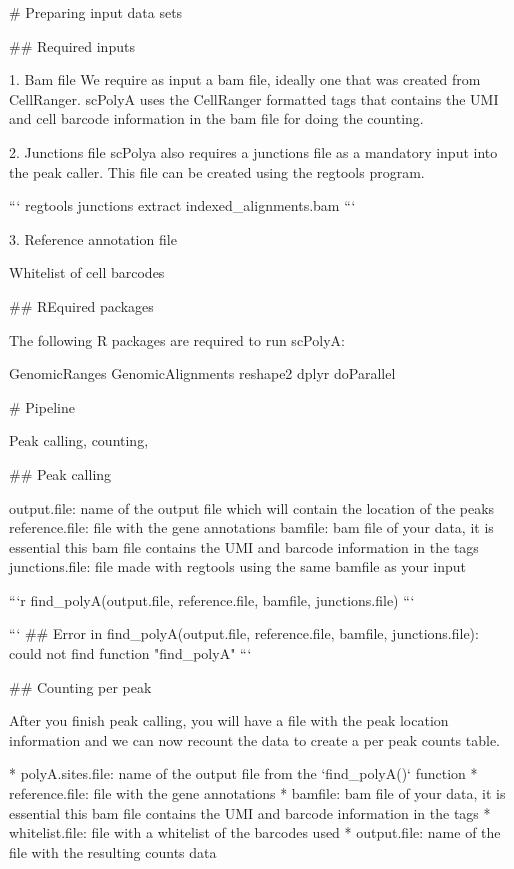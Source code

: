 # Preparing input data sets

## Required inputs



1. Bam file We require as input a bam file, ideally one that was created from CellRanger. scPolyA uses the CellRanger formatted tags that contains the UMI and cell barcode information in the bam file for doing the counting.

2. Junctions file scPolya also requires a junctions file as a mandatory input into the peak caller. This file can be created using the regtools program.

```
regtools junctions extract indexed_alignments.bam
```


3. Reference annotation file

    Whitelist of cell barcodes




## REquired packages

The following R packages are required to run scPolyA:

    GenomicRanges
    GenomicAlignments
    reshape2
    dplyr
    doParallel



# Pipeline

Peak calling, counting, 

## Peak calling


    output.file: name of the output file which will contain the location of the peaks
    reference.file: file with the gene annotations
    bamfile: bam file of your data, it is essential this bam file contains the UMI and barcode information in the tags
    junctions.file: file made with regtools using the same bamfile as your input


```r
find_polyA(output.file, reference.file, bamfile, junctions.file) 
```

```
## Error in find_polyA(output.file, reference.file, bamfile, junctions.file): could not find function "find_polyA"
```



## Counting per peak 

After you finish peak calling, you will have a file with the peak location information and we can now recount the data to create a per peak counts table. 

* polyA.sites.file: name of the output file from the `find_polyA()` function
* reference.file: file with the gene annotations 
* bamfile: bam file of your data, it is essential this bam file contains the UMI and barcode information in the tags 
* whitelist.file: file with a whitelist of the barcodes used 
* output.file: name of the file with the resulting counts data 



